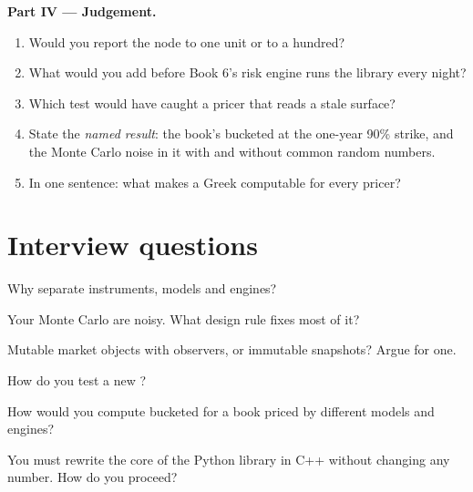 \begin{problem}
\medskip\noindent\textbf{Part IV --- Judgement.}
\begin{enumerate}[resume]
\item Would you report the node  to one unit or to a hundred?
\item What would you add before Book 6's risk engine runs the library every night?
\item Which test would have caught a pricer that reads a stale surface?
\item State the \emph{named result}: the book's bucketed  at the one-year 90\% strike, and the Monte Carlo noise in it with and without common random numbers.
\item In one sentence: what makes a Greek computable for every pricer?
\end{enumerate}
\end{problem}

\section{Interview questions}

\begin{interviewq}\label{iq:dv:build-a-pricing-library:1}
Why separate instruments, models and engines?
\end{interviewq}

\begin{interviewq}\label{iq:dv:build-a-pricing-library:2}
Your Monte Carlo  are noisy. What design rule fixes most of it?
\end{interviewq}

\begin{interviewq}\label{iq:dv:build-a-pricing-library:3}
Mutable market objects with observers, or immutable snapshots? Argue for one.
\end{interviewq}

\begin{interviewq}\label{iq:dv:build-a-pricing-library:4}
How do you test a new ?
\end{interviewq}

\begin{interviewq}\label{iq:dv:build-a-pricing-library:5}
How would you compute bucketed  for a book priced by different models and engines?
\end{interviewq}

\begin{interviewq}\label{iq:dv:build-a-pricing-library:6}
You must rewrite the core of the Python library in C++ without changing any number. How do you proceed?
\end{interviewq}
